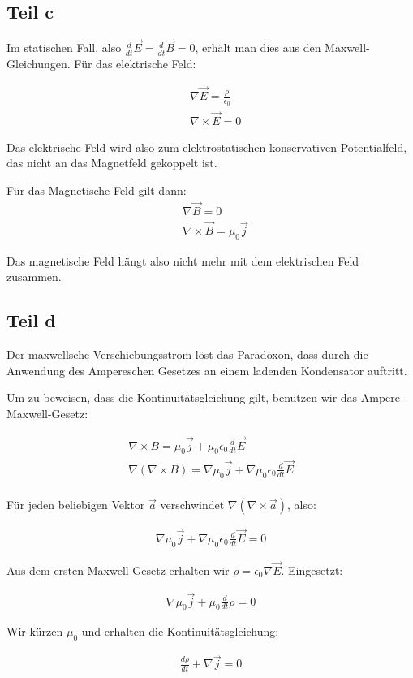 \documentclass[a4paper,german,12pt,smallheadings]{scrartcl}
\begin{document}
\subsection*{Teil c}
Im statischen Fall, also $\frac{d}{dt} \vec{E} = \frac{d}{dt} \vec{B} = 0$,
erhält man dies aus den Maxwell-Gleichungen. Für das elektrische Feld:

\begin{align*}
  &\nabla \vec{E} = \frac{\rho}{\epsilon_0} \\
  &\nabla \times \vec{E} = 0
\end{align*}

Das elektrische Feld wird also zum elektrostatischen konservativen
Potentialfeld, das nicht an das Magnetfeld gekoppelt ist.

Für das Magnetische Feld gilt dann:
\begin{align*}
  &\nabla \vec{B} = 0 \\
  &\nabla \times \vec{B} = \mu_0 \vec{j}
\end{align*}

Das magnetische Feld hängt also nicht mehr mit dem elektrischen Feld zusammen.

\subsection*{Teil d}

Der maxwellsche Verschiebungsstrom löst das Paradoxon, dass durch die Anwendung
des Ampereschen Gesetzes an einem ladenden Kondensator auftritt.

Um zu beweisen, dass die Kontinuitätsgleichung gilt, benutzen wir das
Ampere-Maxwell-Gesetz:

\begin{align*}
  \nabla \times B = \mu_0 \vec{j} + \mu_0 \epsilon_0 \frac{d}{dt} \vec{E} \\
  \nabla(\nabla \times B) = \nabla \mu_0 \vec{j} + \nabla \mu_0 \epsilon_0 \frac{d}{dt} \vec{E} \\
\end{align*}

Für jeden beliebigen Vektor $\vec{a}$ verschwindet $\nabla(\nabla \times \vec{a})$, also:

\begin{align*}
  \nabla \mu_0 \vec{j} + \nabla \mu_0 \epsilon_0 \frac{d}{dt} \vec{E} = 0
\end{align*}

Aus dem ersten Maxwell-Gesetz erhalten wir $\rho = \epsilon_0 \nabla \vec{E}$.
Eingesetzt:

\begin{align*}
  \nabla \mu_0 \vec{j} + \mu_0 \frac{d}{dt} \rho = 0
\end{align*}

Wir kürzen $\mu_0$ und erhalten die Kontinuitätsgleichung:

\begin{align*}
  \frac{d \rho}{d t} + \nabla \vec{j} = 0
\end{align*}
\end{document}
